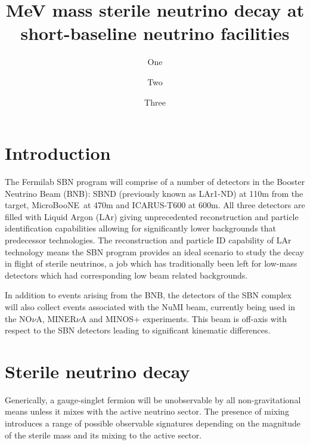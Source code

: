 \documentclass[11pt, a4paper]{article}
\title{MeV mass sterile neutrino decay at short-baseline neutrino facilities}
\author{One}
\author{Two}
\author{Three}
\affiliation{Institute for Particle Physics Phenomenology, Department of
Physics, Durham University, South Road, Durham DH1 3LE, United Kingdom}
\def\muboone{MicroBooNE}
\begin{document}
 

\maketitle

\section{Introduction}
The Fermilab SBN program \cite{Antonello:2015lea} will comprise of a number of detectors in the Booster Neutrino Beam (BNB): SBND (previously known as LAr1-ND) at 110m from the target, \muboone\ at 470m and ICARUS-T600 at 600m. All three detectors are filled with Liquid Argon (LAr) giving unprecedented reconstruction and particle identification capabilities allowing for significantly lower backgrounds that predecessor technologies. The reconstruction and particle ID capability of LAr technology means the SBN program provides an ideal scenario to study the decay in flight of sterile neutrinos, a job which has traditionally been left for low-mass detectors which had corresponding low beam related backgrounds. 

In addition to events arising from the BNB, the detectors of the SBN complex
will also collect events associated with the NuMI beam, currently being used in
the NO$\nu$A, MINER$\nu$A and MINOS+ experiments. This beam is off-axis with respect to the SBN detectors leading to significant kinematic differences.
\section{Sterile neutrino decay}

Generically, a gauge-singlet fermion will be unobservable by all
non-gravitational means unless it mixes with the active neutrino sector. The
presence of mixing introduces a range of possible observable signatures
depending on the magnitude of the sterile mass and its mixing to the active
sector. 
\end{document}
